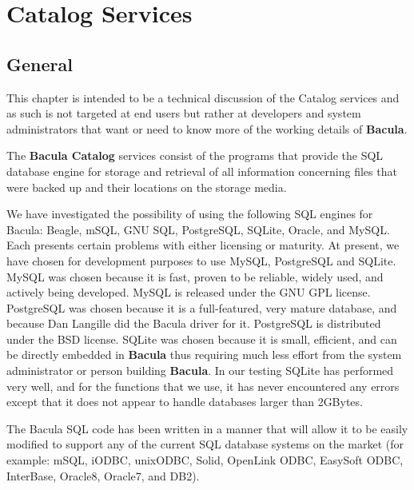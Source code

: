 
\section*{Catalog Services}
\label{_ChapterStart30}

\subsection*{General}

This chapter is intended to be a technical discussion of the Catalog services
and as such is not targeted at end users but rather at developers and system
administrators that want or need to know more of the working details of {\bf
Bacula}. 

The {\bf Bacula Catalog} services consist of the programs that provide the SQL
database engine for storage and retrieval of all information concerning files
that were backed up and their locations on the storage media. 

We have investigated the possibility of using the following SQL engines for
Bacula: Beagle, mSQL, GNU SQL, PostgreSQL, SQLite, Oracle, and MySQL. Each
presents certain problems with either licensing or maturity. At present, we
have chosen for development purposes to use MySQL, PostgreSQL and SQLite.
MySQL was chosen because it is fast, proven to be reliable, widely used, and
actively being developed. MySQL is released under the GNU GPL license.
PostgreSQL was chosen because it is a full-featured, very mature database, and
because Dan Langille did the Bacula driver for it. PostgreSQL is distributed
under the BSD license. SQLite was chosen because it is small, efficient, and
can be directly embedded in {\bf Bacula} thus requiring much less effort from
the system administrator or person building {\bf Bacula}. In our testing
SQLite has performed very well, and for the functions that we use, it has
never encountered any errors except that it does not appear to handle
databases larger than 2GBytes. 

The Bacula SQL code has been written in a manner that will allow it to be
easily modified to support any of the current SQL database systems on the
market (for example: mSQL, iODBC, unixODBC, Solid, OpenLink ODBC, EasySoft
ODBC, InterBase, Oracle8, Oracle7, and DB2). 

